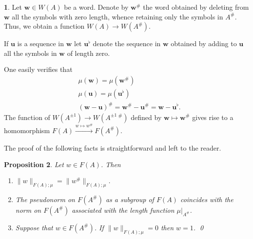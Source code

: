 \documentclass[12pt]{amsart}
\newtheorem{prop}{Proposition}[section]
\theoremstyle{definition}
\newtheorem{void}[prop]{}
\newcommand{\B}[1]{\mathbf{#1}}
\newcommand{\xto}[1]{\xrightarrow{#1}}
\def\Free{F}
\begin{document}
\begin{void}\label{V:sharp hom FA}
Let $\B w \in W(A)$ be a word.
Denote by $\B w^\#$ the word obtained by deleting from $\B w$ all the symbols with zero length, whence retaining only the symbols in $A^\#$.
Thus, we obtain a function $W(A) \to W(A^\#)$.

If $\B u$ is a sequence in $\B w$ let $\B u^\flat$ denote the sequence in $\B w$ obtained by adding to $\B u$ all the symbols in $\B w$ of length zero.



One easily verifies that %
\begin{align}
\label{E:sharp flat equalities}
& \mu(\B w)=\mu(\B w^\#) \\
\nonumber
& \mu(\B u)=\mu(\B u^\flat) \\
\nonumber
& (\B w - \B u)^\#=\B w^\#-\B u^\# = \B w - \B u^\flat.
\end{align}
The function of $W(A^{\pm 1}) \to W(A^{\pm 1}\,{}^\#)$ defined by $\B w\mapsto \B w^\#$ gives rise to a homomorphism
$
\Free(A) \xto{w \mapsto w^\#} \Free(A^\#).
$
\end{void}

\noindent
The proof of the following facts is straightforward and left to the reader.


\begin{prop}\label{P:sharp operation properties in F(A)}
Let $w \in \Free(A)$.
Then
\begin{enumerate}[label=(\roman*)]
\item 
\label{P:sharp operation properties in F(A):norm invariant}
$\| w\|_{\Free(A);\mu} = \| w^\#\|_{\Free(A);\mu}$.


\item
\label{P:sharp operation properties in F(A):subspace}
The pseudonorm on $\Free(A^\#)$ as a subgroup of $\Free(A)$ coincides with the norm on $\Free(A^\#)$ associated with the length function $\mu|_{A^\#}$.


\item
\label{P:sharp operation properties in F(A):separate}
Suppose that $w \in \Free(A^\#)$. 
If $\|w\|_{\Free(A);\mu}=0$ then $w=1$.
\qed
\end{enumerate}
\end{prop}
\end{document}

